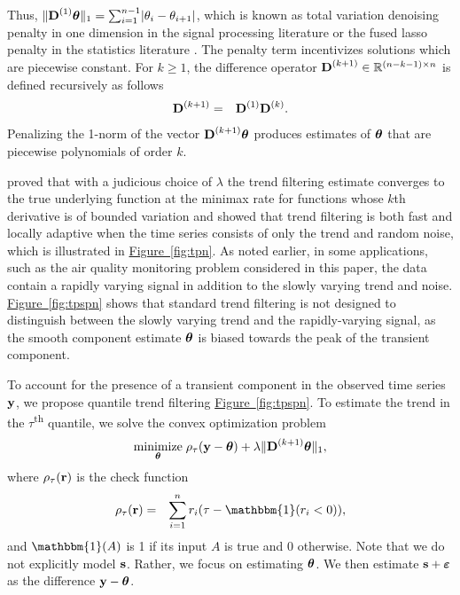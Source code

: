 \documentclass[aoas]{imsart}
\newcommand{\Fig}[1]{\hyperref[fig:#1]{Figure~\ref*{fig:#1}}} %
\newcommand{\Fig}[1]{{Figure~\ref{fig:#1}}} %
\newcommand{\Real}{\mathbb{R}}
\newcommand{\One}{\mathbbm{1}}
\newcommand{\V}[1]{{\bm{\mathbf{\MakeLowercase{#1}}}}} %
\newcommand{\VE}[2]{\MakeLowercase{#1}_{#2}} %
\newcommand{\M}[1]{{\bm{\mathbf{\MakeUppercase{#1}}}}} %
\newcommand{\Mn}[2]{\M{#1}^{(#2)}} %
\begin{document}
Thus, $\lVert \Mn{D}{1}\V{\theta} \rVert_1 = \sum_{i=1}^{n-1} \lvert \theta_i - \theta_{i+1} \rvert$, which is known as total variation denoising penalty in one dimension in the signal processing literature \citep{Rudin1992} or the fused lasso penalty in the statistics literature \citep{Tibshirani2005}. The penalty term incentivizes solutions which are piecewise constant. For $k \geq 1$, the difference operator $\Mn{D}{k+1} \in \Real^{(n-k-1) \times n}$ is defined recursively as follows
\begin{eqnarray*}
	\Mn{D}{k+1} & = & \Mn{D}{1}\Mn{D}{k}.
\end{eqnarray*}
Penalizing the 1-norm of the vector $\Mn{D}{k+1}\V{\theta}$ produces estimates of $\V{\theta}$ that are piecewise polynomials of order $k$.

\cite{Tib2014} proved that with a judicious choice of $\lambda$ the trend filtering estimate converges to the true underlying function at the minimax rate for functions whose $k$th derivative is of bounded variation and showed that trend filtering is both fast and locally adaptive when the time series consists of only the trend and random noise, which is illustrated in \Fig{tpn}. As noted earlier, in some applications, such as the air quality monitoring problem considered in this paper, the data contain a rapidly varying signal in addition to the slowly varying trend and noise. \Fig{tpspn} shows that standard trend filtering is not designed to distinguish between the slowly varying trend and the rapidly-varying signal, as the smooth component estimate $\V{\theta}$ is biased towards the peak of the transient component.

To account for the presence of a transient component in the observed time series $\V{y}$, we propose quantile trend filtering \Fig{tpspn}. %
To estimate the trend in the $\tau$\textsuperscript{th} quantile, we solve the convex optimization problem
\begin{eqnarray}
\label{eq:quantile_trend}
\underset{\V{\theta}}{\text{minimize}}\; \rho_\tau(\V{y} - \V{\theta}) + \lambda \lVert \Mn{D}{k+1} \V{\theta} \rVert_1,
\end{eqnarray}
where $\rho_\tau(\V{r})$ is the check function
\begin{eqnarray}
\label{eq:check}
\rho_{\tau}(\V{r}) & = & \sum_{i=1}^n \VE{r}{i}(\tau-\One(\VE{r}{i}<0)),
\end{eqnarray}
and $\One(A)$ is 1 if its input $A$ is true and 0 otherwise. Note that we do not explicitly model $\V{s}$. Rather, we focus on estimating $\V{\theta}$. We then estimate $\V{s} + \V{\varepsilon}$ as the difference $\V{y} - \V{\theta}$.
\end{document}
